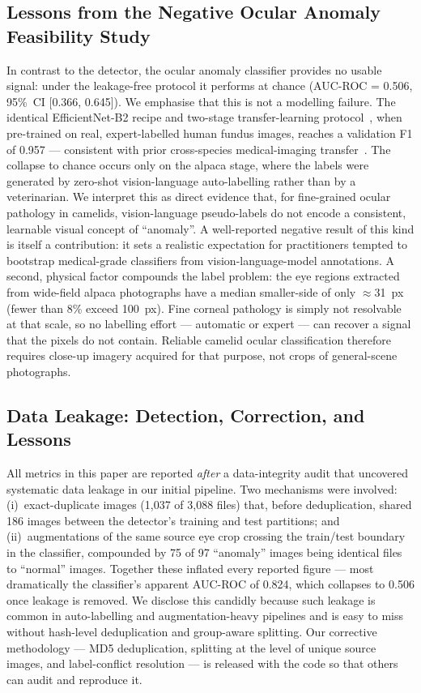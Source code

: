 \documentclass[journal=animals,article=article,submit=mdpi,moreauthors=true,pdftex]{mdpi}
\begin{document}
\subsection{Lessons from the Negative Ocular Anomaly Feasibility Study}

In contrast to the detector, the ocular anomaly classifier provides no usable signal:
under the leakage-free protocol it performs at chance (AUC-ROC = 0.506, 95\%~CI
[0.366, 0.645]). We emphasise that this is not a modelling failure. The identical
EfficientNet-B2 recipe and two-stage transfer-learning
protocol~\cite{pan2010,yosinski2014}, when pre-trained on real, expert-labelled human
fundus images, reaches a validation F1 of 0.957 --- consistent with prior cross-species
medical-imaging transfer~\cite{gulshan2016,mdpi2025canine}. The collapse to chance occurs
only on the alpaca stage, where the labels were generated by zero-shot vision-language
auto-labelling rather than by a veterinarian. We interpret this as direct evidence that,
for fine-grained ocular pathology in camelids, vision-language pseudo-labels do not encode a
consistent, learnable visual concept of ``anomaly''. A well-reported negative result of
this kind is itself a contribution: it sets a realistic expectation for practitioners
tempted to bootstrap medical-grade classifiers from vision-language-model annotations.
A second, physical factor compounds the label problem: the eye regions extracted from
wide-field alpaca photographs have a median smaller-side of only $\approx$31~px (fewer
than 8\% exceed 100~px). Fine corneal pathology is simply not resolvable at that scale,
so no labelling effort --- automatic or expert --- can recover a signal that the pixels do
not contain. Reliable camelid ocular classification therefore requires close-up imagery
acquired for that purpose, not crops of general-scene photographs.

\subsection{Data Leakage: Detection, Correction, and Lessons}

All metrics in this paper are reported \emph{after} a data-integrity audit that
uncovered systematic data leakage in our initial pipeline. Two mechanisms were involved:
(i)~exact-duplicate images (1,037 of 3,088 files) that, before deduplication, shared
186 images between the detector's training and test partitions; and (ii)~augmentations of
the same source eye crop crossing the train/test boundary in the classifier, compounded
by 75 of 97 ``anomaly'' images being identical files to ``normal'' images. Together these
inflated every reported figure --- most dramatically the classifier's apparent
AUC-ROC of 0.824, which collapses to 0.506 once leakage is removed. We disclose this
candidly because such leakage is common in auto-labelling and augmentation-heavy
pipelines and is easy to miss without hash-level deduplication and group-aware splitting.
Our corrective methodology --- MD5 deduplication, splitting at the level of unique source
images, and label-conflict resolution --- is released with the code so that others can
audit and reproduce it.
\end{document}
